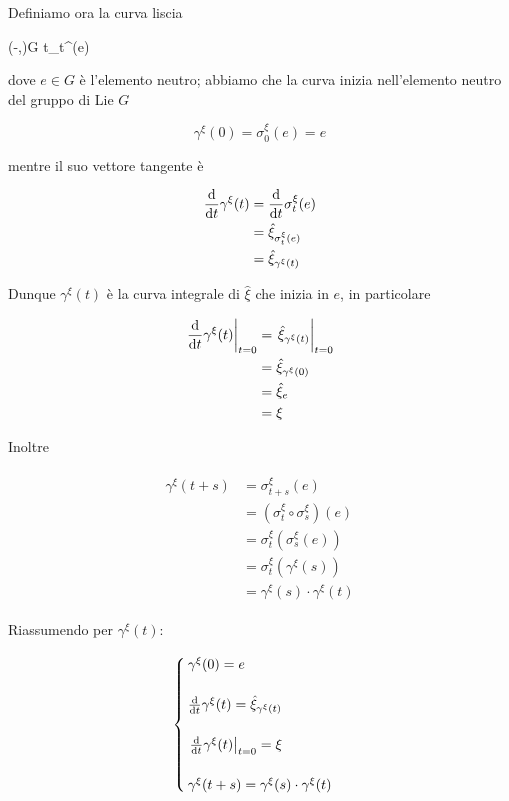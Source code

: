 Definiamo ora la curva liscia

\map{\gamma^{\xi}}%
	{(-\delta,\delta)}{G}%
	{t}{\sigma_{t}^{\xi}(e)}
	
dove $ e \in G $ è l'elemento neutro; abbiamo che la curva inizia nell'elemento neutro del gruppo di Lie $ G $

\begin{equation}
	\gamma^{\xi}(0) = \sigma_{0}^{\xi}(e) = e
\end{equation}

mentre il suo vettore tangente è

\begin{align}
	\begin{split}
		\dv{t} \gamma^{\xi}(t) &= \dv{t} \sigma_{t}^{\xi}(e)\\
		&= \hat{\xi}_{\sigma_{t}^{\xi}(e)}\\
		&= \hat{\xi}_{\gamma^{\xi}(t)}
	\end{split}
\end{align}

Dunque $ \gamma^{\xi}(t) $ è la curva integrale di $ \hat{\xi} $ che inizia in $ e $, in particolare

\begin{align}
	\begin{split}
		\eval{ \dv{t} \gamma^{\xi}(t) }_{t=0} &= \eval{ \hat{\xi}_{\gamma^{\xi}(t)} }_{t=0}\\
		&= \hat{\xi}_{\gamma^{\xi}(0)}\\
		&= \hat{\xi}_{e}\\
		&= \xi
	\end{split}
\end{align}

Inoltre

\begin{align}
	\begin{split}
		\gamma^{\xi}(t+s) &= \sigma_{t+s}^{\xi}(e)\\
		&= (\sigma_{t}^{\xi} \circ \sigma_{s}^{\xi})(e)\\
		&= \sigma_{t}^{\xi}(\sigma_{s}^{\xi}(e))\\
		&= \sigma_{t}^{\xi}(\gamma^{\xi}(s))\\
		&= \gamma^{\xi}(s) \cdot \gamma^{\xi}(t)
	\end{split}
\end{align}

Riassumendo per $ \gamma^{\xi}(t) $:

\begin{equation}
	\begin{cases}
		\gamma^{\xi}(0) = e\\\\
		\dv{t} \gamma^{\xi}(t) = \hat{\xi}_{\gamma^{\xi}(t)}\\\\
		\eval{ \dv{t} \gamma^{\xi}(t) }_{t=0} = \xi\\\\
		\gamma^{\xi}(t+s) = \gamma^{\xi}(s) \cdot \gamma^{\xi}(t)
	\end{cases}
\end{equation}
	
